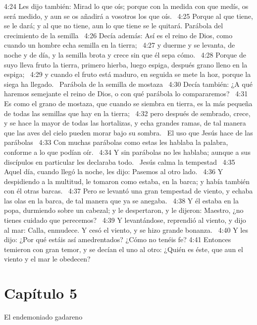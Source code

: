 4:24 Les dijo también: Mirad lo que oís; porque con la medida con que medís, os será medido, y aun se os añadirá a vosotros los que oís.  
4:25 Porque al que tiene, se le dará; y al que no tiene, aun lo que tiene se le quitará. 
Parábola del crecimiento de la semilla  
4:26 Decía además: Así es el reino de Dios, como cuando un hombre echa semilla en la tierra;  
4:27 y duerme y se levanta, de noche y de día, y la semilla brota y crece sin que él sepa cómo.  
4:28 Porque de suyo lleva fruto la tierra, primero hierba, luego espiga, después grano lleno en la espiga;  
4:29 y cuando el fruto está maduro, en seguida se mete la hoz, porque la siega ha llegado.  
Parábola de la semilla de mostaza   
4:30 Decía también: ¿A qué haremos semejante el reino de Dios, o con qué parábola lo compararemos?  
4:31 Es como el grano de mostaza, que cuando se siembra en tierra, es la más pequeña de todas las semillas que hay en la tierra;  
4:32 pero después de sembrado, crece, y se hace la mayor de todas las hortalizas, y echa grandes ramas, de tal manera que las aves del cielo pueden morar bajo su sombra.  
El uso que Jesús hace de las parábolas   
4:33 Con muchas parábolas como estas les hablaba la palabra, conforme a lo que podían oír.  
4:34 Y sin parábolas no les hablaba; aunque a sus discípulos en particular les declaraba todo.  
Jesús calma la tempestad   
4:35 Aquel día, cuando llegó la noche, les dijo: Pasemos al otro lado.  
4:36 Y despidiendo a la multitud, le tomaron como estaba, en la barca; y había también con él otras barcas.  
4:37 Pero se levantó una gran tempestad de viento, y echaba las olas en la barca, de tal manera que ya se anegaba.  
4:38 Y él estaba en la popa, durmiendo sobre un cabezal; y le despertaron, y le dijeron: Maestro, ¿no tienes cuidado que perecemos?  
4:39 Y levantándose, reprendió al viento, y dijo al mar: Calla, enmudece. Y cesó el viento, y se hizo grande bonanza.  
4:40 Y les dijo: ¿Por qué estáis así amedrentados? ¿Cómo no tenéis fe? 
4:41 Entonces temieron con gran temor, y se decían el uno al otro: ¿Quién es éste, que aun el viento y el mar le obedecen?  
\section*{Capítulo 5}
El endemoniado gadareno   

